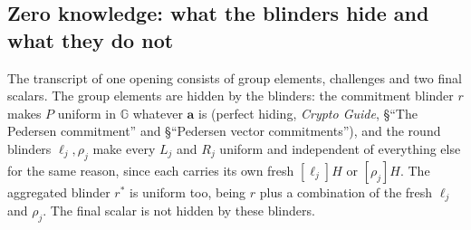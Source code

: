 \documentclass[11pt,a4paper]{article}
\theoremstyle{definition}
\newcommand{\G}{\mathbb{G}}
\begin{document}
\subsection{Zero knowledge: what the blinders hide and what they do not}
\label{sec:ipa-zk}

The transcript of one opening consists of group elements, challenges
and two final scalars. The group elements are hidden by the blinders:
the commitment blinder $r$ makes $P$ uniform in $\G$ whatever
$\mathbf a$ is (perfect hiding, \emph{Crypto Guide}, \S``The Pedersen
commitment'' and \S``Pedersen vector commitments''), and the round
blinders $\ell_j, \rho_j$ make every $L_j$ and $R_j$ uniform and
independent of everything else for the same reason, since each carries
its own fresh $[\ell_j]H$ or $[\rho_j]H$. The aggregated blinder $r^{*}$
is uniform too, being $r$ plus a combination of the fresh $\ell_j$ and
$\rho_j$. The final scalar is not hidden by these blinders.
\end{document}
